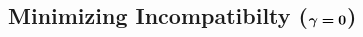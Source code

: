 %


\subsection{%
    Minimizing Incompatibilty
    (\texorpdfstring{$\boldsymbol\gamma\boldsymbol=\mathbf{0}$}{gamma=0})%
} \label{sec:minimize-inc}


